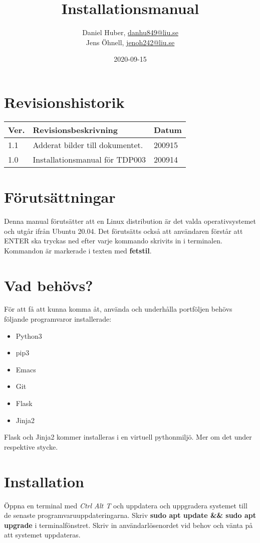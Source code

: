 \documentclass{TDP003mall}
\author{Daniel Huber, \url{danhu849@liu.se}\\
  Jens Öhnell, \url{jenoh242@liu.se}}
\title{Installationsmanual}
\date{2020-09-15}
\begin{document}
\projectpage
\section{Revisionshistorik}
\begin{table}[!h]
\begin{tabularx}{\linewidth}{|l|X|l|}
\hline
Ver. & Revisionsbeskrivning & Datum \\\hline
1.1 & Adderat bilder till dokumentet. & 200915 \\\hline
1.0 & Installationsmanual för TDP003 & 200914 \\\hline
\end{tabularx}
\end{table}

\section{Förutsättningar}
Denna manual förutsätter att en Linux distribution är det valda operativsystemet och utgår ifrån Ubuntu 20.04. Det förutsätts också att användaren förstår att ENTER ska tryckas ned efter varje kommando skrivits in i terminalen. Kommandon är markerade i texten med \textbf{fetstil}.

\section{Vad behövs?}
För att få att kunna komma åt, använda och underhålla portföljen behövs följande programvaror installerade:
\begin{itemize}
  \item Python3
  \item pip3
  \item Emacs
  \item Git
  \item Flask
  \item Jinja2   
  \end{itemize}

Flask och Jinja2 kommer installeras i en virtuell pythonmiljö. Mer om det under respektive stycke.

\section{Installation}
Öppna en terminal med \emph{Ctrl Alt T} och uppdatera och uppgradera systemet till de senaste programvaruuppdateringarna. Skriv \textbf{sudo apt update \&\& sudo apt upgrade} i terminalfönstret. Skriv in användarlösenordet vid behov och vänta på att systemet uppdateras.
\end{document}
